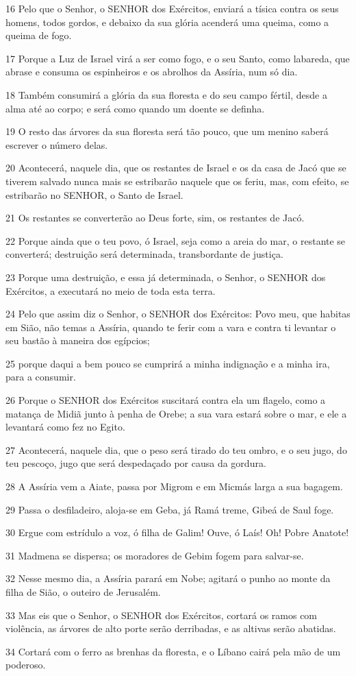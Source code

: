 \par 16 Pelo que o Senhor, o SENHOR dos Exércitos, enviará a tísica contra os seus homens, todos gordos, e debaixo da sua glória acenderá uma queima, como a queima de fogo.
\par 17 Porque a Luz de Israel virá a ser como fogo, e o seu Santo, como labareda, que abrase e consuma os espinheiros e os abrolhos da Assíria, num só dia.
\par 18 Também consumirá a glória da sua floresta e do seu campo fértil, desde a alma até ao corpo; e será como quando um doente se definha.
\par 19 O resto das árvores da sua floresta será tão pouco, que um menino saberá escrever o número delas.
\par 20 Acontecerá, naquele dia, que os restantes de Israel e os da casa de Jacó que se tiverem salvado nunca mais se estribarão naquele que os feriu, mas, com efeito, se estribarão no SENHOR, o Santo de Israel.
\par 21 Os restantes se converterão ao Deus forte, sim, os restantes de Jacó.
\par 22 Porque ainda que o teu povo, ó Israel, seja como a areia do mar, o restante se converterá; destruição será determinada, transbordante de justiça.
\par 23 Porque uma destruição, e essa já determinada, o Senhor, o SENHOR dos Exércitos, a executará no meio de toda esta terra.
\par 24 Pelo que assim diz o Senhor, o SENHOR dos Exércitos: Povo meu, que habitas em Sião, não temas a Assíria, quando te ferir com a vara e contra ti levantar o seu bastão à maneira dos egípcios;
\par 25 porque daqui a bem pouco se cumprirá a minha indignação e a minha ira, para a consumir.
\par 26 Porque o SENHOR dos Exércitos suscitará contra ela um flagelo, como a matança de Midiã junto à penha de Orebe; a sua vara estará sobre o mar, e ele a levantará como fez no Egito.
\par 27 Acontecerá, naquele dia, que o peso será tirado do teu ombro, e o seu jugo, do teu pescoço, jugo que será despedaçado por causa da gordura.
\par 28 A Assíria vem a Aiate, passa por Migrom e em Micmás larga a sua bagagem.
\par 29 Passa o desfiladeiro, aloja-se em Geba, já Ramá treme, Gibeá de Saul foge.
\par 30 Ergue com estrídulo a voz, ó filha de Galim! Ouve, ó Laís! Oh! Pobre Anatote!
\par 31 Madmena se dispersa; os moradores de Gebim fogem para salvar-se.
\par 32 Nesse mesmo dia, a Assíria parará em Nobe; agitará o punho ao monte da filha de Sião, o outeiro de Jerusalém.
\par 33 Mas eis que o Senhor, o SENHOR dos Exércitos, cortará os ramos com violência, as árvores de alto porte serão derribadas, e as altivas serão abatidas.
\par 34 Cortará com o ferro as brenhas da floresta, e o Líbano cairá pela mão de um poderoso.

